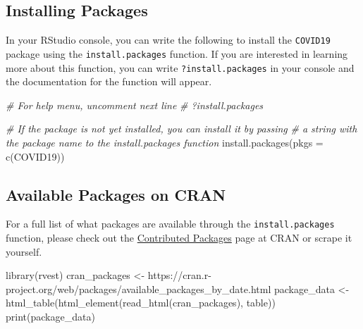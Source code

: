 \documentclass[
]{book}
\newenvironment{Shaded}{\begin{snugshade}}{\end{snugshade}}
\newcommand{\AttributeTok}[1]{\textcolor[rgb]{0.77,0.63,0.00}{#1}}
\newcommand{\CommentTok}[1]{\textcolor[rgb]{0.56,0.35,0.01}{\textit{#1}}}
\newcommand{\FunctionTok}[1]{\textcolor[rgb]{0.00,0.00,0.00}{#1}}
\newcommand{\NormalTok}[1]{#1}
\newcommand{\OtherTok}[1]{\textcolor[rgb]{0.56,0.35,0.01}{#1}}
\newcommand{\StringTok}[1]{\textcolor[rgb]{0.31,0.60,0.02}{#1}}
\begin{document}
\hypertarget{installing-packages}{%
\subsection{Installing Packages}\label{installing-packages}}

In your RStudio console, you can write the following to install the \texttt{COVID19} package using the \texttt{install.packages} function. If you are interested in learning more about this function, you can write \texttt{?install.packages} in your console and the documentation for the function will appear.

\begin{Shaded}
\begin{Highlighting}[]
\CommentTok{\# For help menu, uncomment next line}
\CommentTok{\# ?install.packages }

\CommentTok{\# If the package is not yet installed, you can install it by passing }
\CommentTok{\# a string with the package name to the \textasciigrave{}install.packages\textasciigrave{} function}
\FunctionTok{install.packages}\NormalTok{(}\AttributeTok{pkgs =} \FunctionTok{c}\NormalTok{(}\StringTok{\textquotesingle{}COVID19\textquotesingle{}}\NormalTok{))}
\end{Highlighting}
\end{Shaded}

\hypertarget{available-packages-on-cran}{%
\subsection{Available Packages on CRAN}\label{available-packages-on-cran}}

For a full list of what packages are available through the \texttt{install.packages} function, please check out the \href{https://cran.r-project.org/web/packages/index.html}{Contributed Packages} page at CRAN or scrape it yourself.\\

\begin{Shaded}
\begin{Highlighting}[]
\FunctionTok{library}\NormalTok{(rvest)}
\NormalTok{cran\_packages }\OtherTok{\textless{}{-}} \StringTok{\textquotesingle{}https://cran.r{-}project.org/web/packages/available\_packages\_by\_date.html\textquotesingle{}}
\NormalTok{package\_data }\OtherTok{\textless{}{-}} \FunctionTok{html\_table}\NormalTok{(}\FunctionTok{html\_element}\NormalTok{(}\FunctionTok{read\_html}\NormalTok{(cran\_packages), }\StringTok{\textquotesingle{}table\textquotesingle{}}\NormalTok{))}
\FunctionTok{print}\NormalTok{(package\_data)}
\end{Highlighting}
\end{Shaded}
\end{document}
